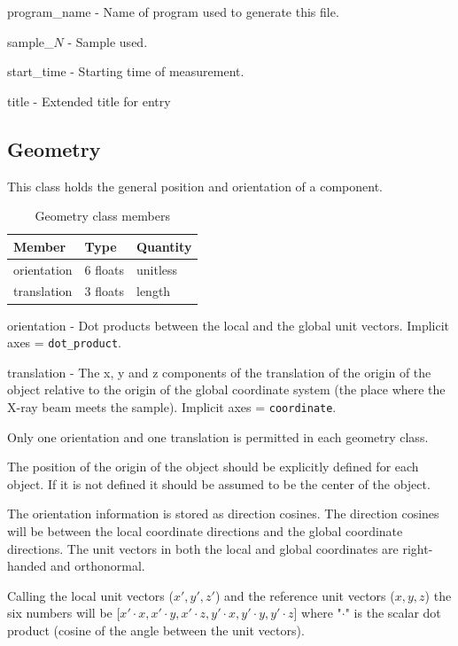 \documentclass[usletter,11pt]{article}
\newcommand{\member}[2]
{ \noindent
{ \color{softBlue}  #1 - } #2
\vspace{0.2cm}
}
\begin{document}
\member{program\_name}{Name of program used to generate this file.}

\member{sample\_$N$}{Sample used.}

\member{start\_time}{Starting time of measurement.}

\member{title}{Extended title for entry}

\subsection{Geometry}
\label{table:geometry}

This class holds the general position and orientation of a component.

\begin{table}[h!]\sffamily \footnotesize
\caption{Geometry class members}

\begin{tabular}{p{4.5cm} p{4.5cm}  p{2.5cm} }
\toprule
\bfseries Member     & \bfseries Type & \bfseries Quantity \\
\midrule

orientation & 6 floats & unitless \\
translation & 3 floats & length \\
\bottomrule
\end{tabular}
\end{table}

\member{orientation}{Dot products between the local and the global unit
  vectors. Implicit axes = {\tt dot\_product}.}

\member{translation}{The x, y and z components of the translation of the origin of the object
 relative to the origin of the global coordinate system (the place
 where the X-ray beam meets the sample). Implicit axes = {\tt coordinate}.}

Only one orientation and one translation is permitted in each geometry
class.

The position of the origin of the object should be explicitly defined for each
object. If it is not defined it should be assumed to be the center of
the object.

The orientation information is stored as direction cosines. The
direction cosines will be between the local coordinate directions and
the global coordinate directions. The unit vectors in both the
local and global coordinates are right-handed and orthonormal. 

Calling the local unit vectors ($x',y',z'$) and the reference unit vectors
($x,y,z$) the six numbers will be [$x' \cdot x, x' \cdot y, x' \cdot z, y' \cdot
x, y'  \cdot y, y' \cdot z$] where "$\cdot$" is the scalar dot product (cosine
of the angle between the unit vectors). 
\end{document}

